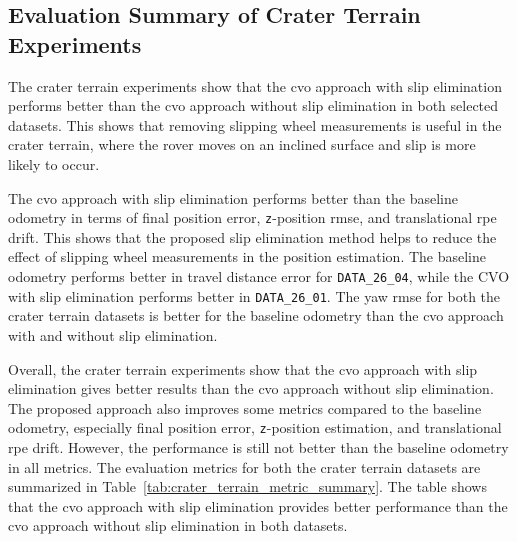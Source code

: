 \documentclass[report.tex]{subfiles}
\begin{document}
    \subsection{Evaluation Summary of Crater Terrain Experiments} \label{subsec:craterTerrainEvalSummary}

    The crater terrain experiments show that the \gls{cvo} approach with slip elimination performs better than the \gls{cvo} approach without slip elimination in both selected datasets. This shows that removing slipping wheel measurements is useful in the crater terrain, where the rover moves on an inclined surface and slip is more likely to occur.

    The \gls{cvo} approach with slip elimination performs better than the baseline odometry in terms of final position error, \texttt{z}-position \gls{rmse}, and translational \gls{rpe} drift. This shows that the proposed slip elimination method helps to reduce the effect of slipping wheel measurements in the position estimation. The baseline odometry performs better in travel distance error for \texttt{DATA\_26\_04}, while the CVO with slip elimination performs better in \texttt{DATA\_26\_01}. The yaw \gls{rmse} for both the crater terrain datasets is better for the baseline odometry than the \gls{cvo} approach with and without slip elimination.

    Overall, the crater terrain experiments show that the \gls{cvo} approach with slip elimination gives better results than the \gls{cvo} approach without slip elimination. The proposed approach also improves some metrics compared to the baseline odometry, especially final position error, \texttt{z}-position estimation, and translational \gls{rpe} drift. However, the performance is still not better than the baseline odometry in all metrics. The evaluation metrics for both the crater terrain datasets are summarized in Table~\ref{tab:crater_terrain_metric_summary}. The table shows that the \gls{cvo} approach with slip elimination provides better performance than the \gls{cvo} approach without slip elimination in both datasets. 
    
\end{document}
